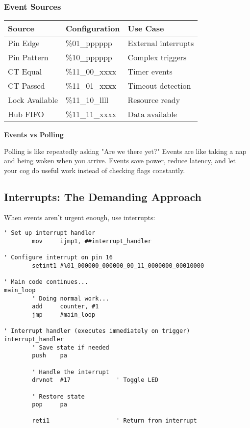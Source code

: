 \documentclass[11pt]{book}
\begin{document}
\hypertarget{event-sources}{%
\subsubsection{Event Sources}\label{event-sources}}

\begin{longtable}[]{@{}lll@{}}
\toprule
Source & Configuration & Use Case \\
\midrule
\endhead
Pin Edge & \%01\_pppppp & External interrupts \\
Pin Pattern & \%10\_pppppp & Complex triggers \\
CT Equal & \%11\_00\_xxxx & Timer events \\
CT Passed & \%11\_01\_xxxx & Timeout detection \\
Lock Available & \%11\_10\_llll & Resource ready \\
Hub FIFO & \%11\_11\_xxxx & Data available \\
\bottomrule
\end{longtable}

\begin{sidetrack}
\textbf{Events vs Polling}

Polling is like repeatedly asking "Are we there yet?" Events are like taking a nap and being woken when you arrive. Events save power, reduce latency, and let your cog do useful work instead of checking flags constantly.
\end{sidetrack}

\hypertarget{interrupts-the-demanding-approach}{%
\subsection{Interrupts: The Demanding
Approach}\label{interrupts-the-demanding-approach}}

When events aren't urgent enough, use interrupts:

\begin{lstlisting}
' Set up interrupt handler
        mov     ijmp1, ##interrupt_handler
        
' Configure interrupt on pin 16
        setint1 #%01_000000_000000_00_11_0000000_00010000
        
' Main code continues...
main_loop
        ' Doing normal work...
        add     counter, #1
        jmp     #main_loop
        
' Interrupt handler (executes immediately on trigger)
interrupt_handler
        ' Save state if needed
        push    pa
        
        ' Handle the interrupt
        drvnot  #17             ' Toggle LED
        
        ' Restore state
        pop     pa
        
        reti1                   ' Return from interrupt
\end{lstlisting}
\end{document}
